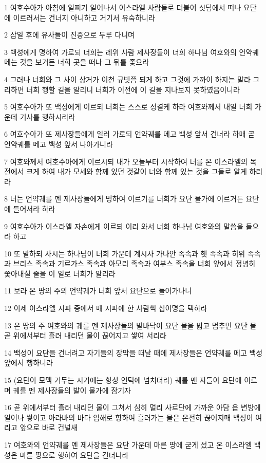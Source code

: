 \par 1 여호수아가 아침에 일찌기 일어나서 이스라엘 사람들로 더불어 싯딤에서 떠나 요단에 이르러서는 건너지 아니하고 거기서 유숙하니라
\par 2 삼일 후에 유사들이 진중으로 두루 다니며
\par 3 백성에게 명하여 가로되 너희는 레위 사람 제사장들이 너희 하나님 여호와의 언약궤 메는 것을 보거든 너희 곳을 떠나 그 뒤를 좇으라
\par 4 그러나 너희와 그 사이 상거가 이천 규빗쯤 되게 하고 그것에 가까이 하지는 말라 그리하면 너희 행할 길을 알리니 너희가 이전에 이 길을 지나보지 못하였음이니라
\par 5 여호수아가 또 백성에게 이르되 너희는 스스로 성결케 하라 여호와께서 내일 너희 가운데 기사를 행하시리라
\par 6 여호수아가 또 제사장들에게 일러 가로되 언약궤를 메고 백성 앞서 건너라 하매 곧 언약궤를 메고 백성 앞서 나아가니라
\par 7 여호와께서 여호수아에게 이르시되 내가 오늘부터 시작하여 너를 온 이스라엘의 목전에서 크게 하여 내가 모세와 함께 있던 것같이 너와 함께 있는 것을 그들로 알게 하리라
\par 8 너는 언약궤를 멘 제사장들에게 명하여 이르기를 너희가 요단 물가에 이르거든 요단에 들어서라 하라
\par 9 여호수아가 이스라엘 자손에게 이르되 이리 와서 너희 하나님 여호와의 말씀을 들으라 하고
\par 10 또 말하되 사시는 하나님이 너희 가운데 계시사 가나안 족속과 헷 족속과 히위 족속과 브리스 족속과 기르가스 족속과 아모리 족속과 여부스 족속을 너희 앞에서 정녕히 쫓아내실 줄을 이 일로 너희가 알리라
\par 11 보라 온 땅의 주의 언약궤가 너희 앞서 요단으로 들어가나니
\par 12 이제 이스라엘 지파 중에서 매 지파에 한 사람씩 십이명을 택하라
\par 13 온 땅의 주 여호와의 궤를 멘 제사장들의 발바닥이 요단 물을 밟고 멈추면 요단 물 곧 위에서부터 흘러 내리던 물이 끊어지고 쌓여 서리라
\par 14 백성이 요단을 건너려고 자기들의 장막을 떠날 때에 제사장들은 언약궤를 메고 백성 앞에서 행하니라
\par 15 (요단이 모맥 거두는 시기에는 항상 언덕에 넘치더라) 궤를 멘 자들이 요단에 이르며 궤를 멘 제사장들의 발이 물가에 잠기자
\par 16 곧 위에서부터 흘러 내리던 물이 그쳐서 심히 멀리 사르단에 가까운 아담 읍 변방에 일어나 쌓이고 아라바의 바다 염해로 향하여 흘러가는 물은 온전히 끊어지매 백성이 여리고 앞으로 바로 건널새
\par 17 여호와의 언약궤를 멘 제사장들은 요단 가운데 마른 땅에 굳게 섰고 온 이스라엘 백성은 마른 땅으로 행하여 요단을 건너니라

